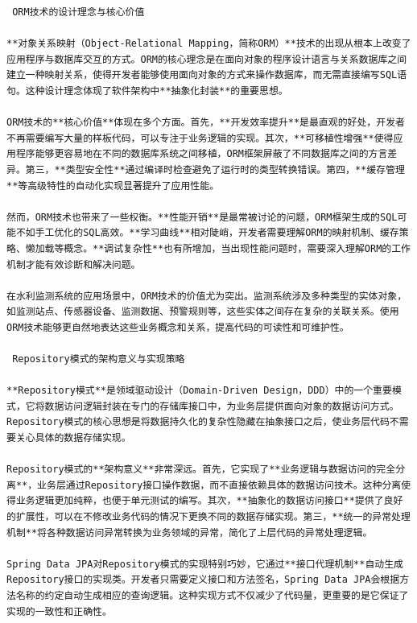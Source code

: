 \begin{lstlisting}
 ORM技术的设计理念与核心价值

**对象关系映射（Object-Relational Mapping，简称ORM）**技术的出现从根本上改变了应用程序与数据库交互的方式。ORM的核心理念是在面向对象的程序设计语言与关系数据库之间建立一种映射关系，使得开发者能够使用面向对象的方式来操作数据库，而无需直接编写SQL语句。这种设计理念体现了软件架构中**抽象化封装**的重要思想。

ORM技术的**核心价值**体现在多个方面。首先，**开发效率提升**是最直观的好处，开发者不再需要编写大量的样板代码，可以专注于业务逻辑的实现。其次，**可移植性增强**使得应用程序能够更容易地在不同的数据库系统之间移植，ORM框架屏蔽了不同数据库之间的方言差异。第三，**类型安全性**通过编译时检查避免了运行时的类型转换错误。第四，**缓存管理**等高级特性的自动化实现显著提升了应用性能。

然而，ORM技术也带来了一些权衡。**性能开销**是最常被讨论的问题，ORM框架生成的SQL可能不如手工优化的SQL高效。**学习曲线**相对陡峭，开发者需要理解ORM的映射机制、缓存策略、懒加载等概念。**调试复杂性**也有所增加，当出现性能问题时，需要深入理解ORM的工作机制才能有效诊断和解决问题。

在水利监测系统的应用场景中，ORM技术的价值尤为突出。监测系统涉及多种类型的实体对象，如监测站点、传感器设备、监测数据、预警规则等，这些实体之间存在复杂的关联关系。使用ORM技术能够更自然地表达这些业务概念和关系，提高代码的可读性和可维护性。

 Repository模式的架构意义与实现策略

**Repository模式**是领域驱动设计（Domain-Driven Design，DDD）中的一个重要模式，它将数据访问逻辑封装在专门的存储库接口中，为业务层提供面向对象的数据访问方式。Repository模式的核心思想是将数据持久化的复杂性隐藏在抽象接口之后，使业务层代码不需要关心具体的数据存储实现。

Repository模式的**架构意义**非常深远。首先，它实现了**业务逻辑与数据访问的完全分离**，业务层通过Repository接口操作数据，而不直接依赖具体的数据访问技术。这种分离使得业务逻辑更加纯粹，也便于单元测试的编写。其次，**抽象化的数据访问接口**提供了良好的扩展性，可以在不修改业务代码的情况下更换不同的数据存储实现。第三，**统一的异常处理机制**将各种数据访问异常转换为业务领域的异常，简化了上层代码的异常处理逻辑。

Spring Data JPA对Repository模式的实现特别巧妙，它通过**接口代理机制**自动生成Repository接口的实现类。开发者只需要定义接口和方法签名，Spring Data JPA会根据方法名称的约定自动生成相应的查询逻辑。这种实现方式不仅减少了代码量，更重要的是它保证了实现的一致性和正确性。
\end{lstlisting}

